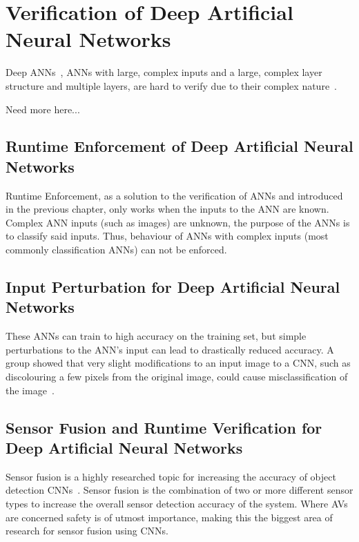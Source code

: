 \section{Verification of Deep Artificial Neural Networks}
Deep \acfp{ANN}~\cite{schmidhuber2015deep}, \acp{ANN} with large, complex inputs and a large, complex layer structure and multiple layers, are hard to verify due to their complex nature~\cite{Gehr2018AI2SA}. 

Need more here...


\subsection{Runtime Enforcement of Deep Artificial Neural Networks}
Runtime Enforcement, as a solution to the verification of \acp{ANN} and introduced in the previous chapter, only works when the inputs to the \ac{ANN} are known. 
Complex \ac{ANN} inputs (such as images) are unknown, the purpose of the \acp{ANN} is to classify said inputs.
Thus, behaviour of \acp{ANN} with complex inputs (most commonly classification \acp{ANN}) can not be enforced. 


\subsection{Input Perturbation for Deep Artificial Neural Networks}
These \acp{ANN} can train to high accuracy on the training set, but simple perturbations to the \ac{ANN}'s input can lead to drastically reduced accuracy.
A group showed that very slight modifications to an input image to a \acf{CNN}, such as discolouring a few pixels from the original image, could cause misclassification of the image~\cite{Gehr2018AI2SA}.

\subsection{Sensor Fusion and Runtime Verification for Deep Artificial Neural Networks}
Sensor fusion is a highly researched topic for increasing the accuracy of object detection \acp{CNN}~\cite{SensorFusion2017}. 
Sensor fusion is the combination of two or more different sensor types to increase the overall sensor detection accuracy of the system.
Where \acfp{AV} are concerned safety is of utmost importance, making this the biggest area of research for sensor fusion using \acp{CNN}.


